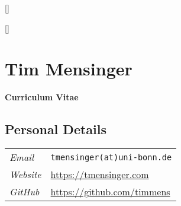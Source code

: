 \documentclass[11pt]{article}
\begin{document}
\pagestyle{fancy}
\titlespacing*{\section}{0pt}{0pt}{0pt}
\titlespacing*{\subsection}{0pt}{0pt}{0pt}
\titleformat{\section}{\normalfont\Large\bfseries}{\thesection}{1em}{}[{\titlerule[0.8pt]}]
\titleformat{\subsection}{\normalfont\bfseries}{\thesection}{1em}{}[{\titlerule[0.4pt]}]


\section*{\hfill \LARGE Tim Mensinger}\vspace*{3pt}
\hfill\textbf{\large Curriculum Vitae}



\vspace{25pt}
\subsection*{Personal Details}

\begin{table}[h!]
    \renewcommand{\arraystretch}{1.4}
    \begin{tabular}{p{70pt} p{420pt}}
         \textit{Email} & \texttt{tmensinger(at)uni-bonn.de}\\
         \textit{Website} & \url{https://tmensinger.com}\\
         \textit{GitHub} & \url{https://github.com/timmens}
    \end{tabular}
\end{table}


\end{document}
